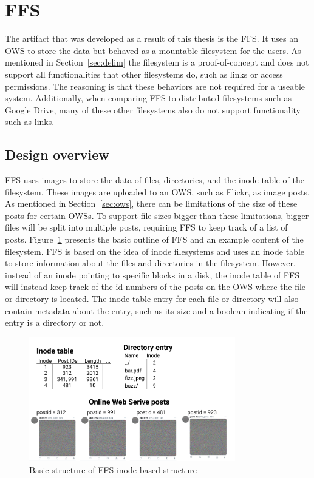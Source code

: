 \section{FFS}
The artifact that was developed as a result of this thesis is the \acrfull{FFS}. It uses an \gls{OWS} to store the data but behaved as a mountable filesystem for the users. As mentioned in Section~\ref{sec:delim} the filesystem is a \mbox{proof-of-concept} and does not support all functionalities that other filesystems do, such as links or access permissions. The reasoning is that these behaviors are not required for a useable system. Additionally, when comparing \gls{FFS} to distributed filesystems such as Google Drive, many of these other filesystems also do not support functionality such as links.

\subsection{Design overview}
\gls{FFS} uses images to store the data of files, directories, and the inode table of the filesystem. These images are uploaded to an \gls{OWS}, such as Flickr, as image posts. As mentioned in Section~\ref{sec:ows}, there can be limitations of the size of these posts for certain \gls{OWS}s. To support file sizes bigger than these limitations, bigger files will be split into multiple posts, requiring \gls{FFS} to keep track of a list of posts. Figure~\ref{fig:ffs_inode_diag} presents the basic outline of \gls{FFS} and an example content of the filesystem. \gls{FFS} is based on the idea of inode filesystems and uses an inode table to store information about the files and directories in the filesystem. However, instead of an inode pointing to specific blocks in a disk, the inode table of \gls{FFS} will instead keep track of the id numbers of the posts on the \gls{OWS} where the file or directory is located. The inode table entry for each file or directory will also contain metadata about the entry, such as its size and a boolean indicating if the entry is a directory or not.

\begin{figure}[!ht]
	\begin{center}
	  \includegraphics[width=0.8\textwidth]{figures/ffs_inode_diagram.png}
	\end{center}
	\caption{Basic structure of \gls{FFS} \mbox{inode-based} structure}
	\label{fig:ffs_inode_diag}
\end{figure}

